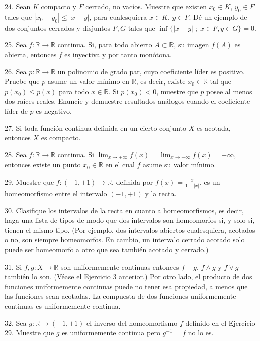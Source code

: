\documentclass[12pt,oneside]{book}
\begin{document}
24. Sean \(K\) compacto y \(F\) cerrado, no vacíos. Muestre que existen \(x_0 \in K\), \(y_0 \in F\) tales que \(|x_0 - y_0| \leq |x - y|\), para cualesquiera \(x \in K\), \(y \in F\). Dé un ejemplo de dos conjuntos cerrados y disjuntos \(F, G\) tales que \(\inf\{|x - y| \; ; \; x \in F, y \in G\} = 0\).

25. Sea \(f: \mathbb{R} \to \mathbb{R}\) continua. Si, para todo abierto \(A \subset \mathbb{R}\), su imagen \(f(A)\) es abierta, entonces \(f\) es inyectiva y por tanto monótona.

26. Sea \(p: \mathbb{R} \to \mathbb{R}\) un polinomio de grado par, cuyo coeficiente líder es positivo. Pruebe que \(p\) asume un valor mínimo en \(\mathbb{R}\), es decir, existe \(x_0 \in \mathbb{R}\) tal que \(p(x_0) \leq p(x)\) para todo \(x \in \mathbb{R}\). Si \(p(x_0) < 0\), muestre que \(p\) posee al menos dos raíces reales. Enuncie y demuestre resultados análogos cuando el coeficiente líder de \(p\) es negativo.

27. Si toda función continua definida en un cierto conjunto \(X\) es acotada, entonces \(X\) es compacto.

28. Sea \(f: \mathbb{R} \to \mathbb{R}\) continua. Si \(\lim_{x \to +\infty} f(x) = \lim_{x \to -\infty} f(x) = +\infty\), entonces existe un punto \(x_0 \in \mathbb{R}\) en el cual \(f\) asume su valor mínimo.

29. Muestre que \(f: (-1, +1) \to \mathbb{R}\), definida por \(f(x) = \frac{x}{1 - |x|}\), es un homeomorfismo entre el intervalo \((-1, +1)\) y la recta.

30. Clasifique los intervalos de la recta en cuanto a homeomorfismos, es decir, haga una lista de tipos de modo que dos intervalos son homeomorfos si, y solo si, tienen el mismo tipo. (Por ejemplo, dos intervalos abiertos cualesquiera, acotados o no, son siempre homeomorfos. En cambio, un intervalo cerrado acotado solo puede ser homeomorfo a otro que sea también acotado y cerrado.)

31. Si \(f, g: X \to \mathbb{R}\) son uniformemente continuas entonces \(f + g\), \(f \wedge g\) y \(f \vee g\) también lo son. (Véase el Ejercicio 3 anterior.) Por otro lado, el producto de dos funciones uniformemente continuas puede no tener esa propiedad, a menos que las funciones sean acotadas. La compuesta de dos funciones uniformemente continuas es uniformemente continua.

32. Sea \(g: \mathbb{R} \to (-1, +1)\) el inverso del homeomorfismo \(f\) definido en el Ejercicio 29. Muestre que \(g\) es uniformemente continua pero \(g^{-1} = f\) no lo es.
\end{document}
